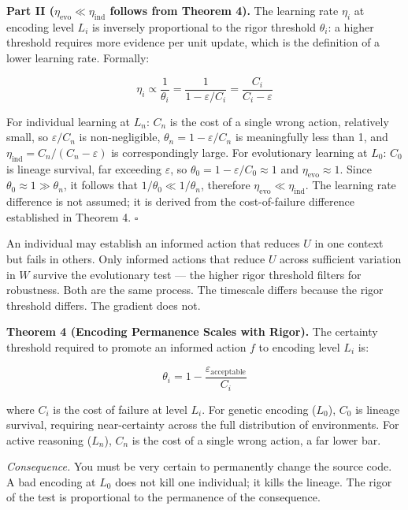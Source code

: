 \documentclass[
]{article}
\begin{document}
\textbf{Part II (\(\eta_{\text{evo}} \ll \eta_{\text{ind}}\) follows
from Theorem 4).} The learning rate \(\eta_i\) at encoding level \(L_i\)
is inversely proportional to the rigor threshold \(\theta_i\): a higher
threshold requires more evidence per unit update, which is the
definition of a lower learning rate. Formally:

\[\eta_i \propto \frac{1}{\theta_i} = \frac{1}{1 - \varepsilon/C_i} = \frac{C_i}{C_i - \varepsilon}\]

For individual learning at \(L_n\): \(C_n\) is the cost of a single
wrong action, relatively small, so \(\varepsilon/C_n\) is
non-negligible, \(\theta_n = 1 - \varepsilon/C_n\) is meaningfully less
than 1, and \(\eta_{\text{ind}} = C_n/(C_n - \varepsilon)\) is
correspondingly large. For evolutionary learning at \(L_0\): \(C_0\) is
lineage survival, far exceeding \(\varepsilon\), so
\(\theta_0 = 1 - \varepsilon/C_0 \approx 1\) and
\(\eta_{\text{evo}} \approx 1\). Since
\(\theta_0 \approx 1 \gg \theta_n\), it follows that
\(1/\theta_0 \ll 1/\theta_n\), therefore
\(\eta_{\text{evo}} \ll \eta_{\text{ind}}\). The learning rate
difference is not assumed; it is derived from the cost-of-failure
difference established in Theorem 4. \(\square\)

An individual may establish an informed action that reduces \(U\) in one
context but fails in others. Only informed actions that reduce \(U\)
across sufficient variation in \(W\) survive the evolutionary test ---
the higher rigor threshold filters for robustness. Both are the same
process. The timescale differs because the rigor threshold differs. The
gradient does not.

\textbf{Theorem 4 (Encoding Permanence Scales with Rigor).} The
certainty threshold required to promote an informed action \(f\) to
encoding level \(L_i\) is:

\[\theta_i = 1 - \frac{\varepsilon_{\text{acceptable}}}{C_i}\]

where \(C_i\) is the cost of failure at level \(L_i\). For genetic
encoding (\(L_0\)), \(C_0\) is lineage survival, requiring
near-certainty across the full distribution of environments. For active
reasoning (\(L_n\)), \(C_n\) is the cost of a single wrong action, a far
lower bar.

\emph{Consequence.} You must be very certain to permanently change the
source code. A bad encoding at \(L_0\) does not kill one individual; it
kills the lineage. The rigor of the test is proportional to the
permanence of the consequence.
\end{document}
